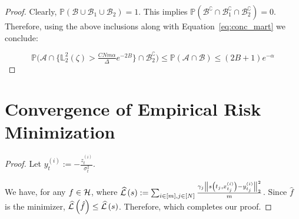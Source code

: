 \begin{proof}
Clearly, $\mathbb{P}(\mathcal{B}\cup \mathcal{B}_1 \cup \mathcal{B}_2) = 1$. This implies $\mathbb{P}(\mathcal{B}^{\complement}\cap \mathcal{B}^{\complement}_1 \cap \mathcal{B}^{\complement}_2) = 0$. Therefore, using the above inclusions along with Equation~\eqref{eq:conc_mart} we conclude:

$$\mathbb{P}\biggr(\mathcal{A}\cap\biggr\{\mathbb{L}_2^2(\zeta) > \tfrac{CNm\alpha}{\Delta}e^{-2B}\biggr\} \cap \mathcal{B}^{\complement}_2\biggr) \leq \mathbb{P}(\mathcal{A}\cap\mathcal{B}) \leq (2B+1)e^{-\alpha}$$
\end{proof}


\section{Convergence of Empirical Risk Minimization}
\label{appendix:convergence_erm}

\squarederrorboundmartingale*
\begin{proof} Let $y_t^{(i)} := -\frac{z_t^{(i)}}{\sigma_t^2}$.

    
    We have, for any $f \in \mathcal{H}$,
    where $\widehat{\mathcal{L}}\left(s\right) := \sum_{i \in [m], j \in [N]}\frac{\gamma_{j}\left\lVert s\left(t_j, x_{t_j}^{(i)}\right)-y_{t_j}^{(i)}\right\rVert_{2}^{2}}{m}$. Since $\hat{f}$ is the minimizer, $\widehat{\mathcal{L}}\left(\hat{f}\right) \leq \widehat{\mathcal{L}}\left(s\right)$. Therefore, 
    which completes our proof.
\end{proof}


